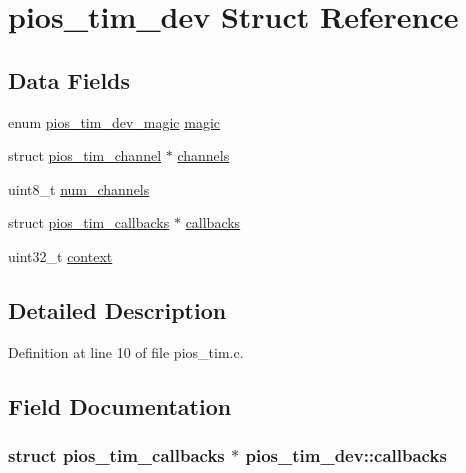 \hypertarget{structpios__tim__dev}{\section{pios\-\_\-tim\-\_\-dev \-Struct \-Reference}
\label{structpios__tim__dev}
}
\subsection*{\-Data \-Fields}
\begin{DoxyCompactItemize}
\item 
enum \hyperlink{_s_t_m32_f10x_2pios__tim_8c_a7d425167804fd43bc76fe29c11386a6c}{pios\-\_\-tim\-\_\-dev\-\_\-magic} \hyperlink{structpios__tim__dev_a3656bfa8d4df8ae08ce3c330edc916f9}{magic}
\item 
struct \hyperlink{structpios__tim__channel}{pios\-\_\-tim\-\_\-channel} $\ast$ \hyperlink{structpios__tim__dev_aa8efb40f5c838a19554da434d2eddf40}{channels}
\item 
uint8\-\_\-t \hyperlink{structpios__tim__dev_a2b129aa6d78b9ba69ff095d8a9c53356}{num\-\_\-channels}
\item 
struct \hyperlink{structpios__tim__callbacks}{pios\-\_\-tim\-\_\-callbacks} $\ast$ \hyperlink{structpios__tim__dev_a1c0871bbdb99b41f2cf6bfa91c375d92}{callbacks}
\item 
uint32\-\_\-t \hyperlink{structpios__tim__dev_aa2ce9a6edd8c06b75330b994f67c95b8}{context}
\end{DoxyCompactItemize}


\subsection{\-Detailed \-Description}


\-Definition at line 10 of file pios\-\_\-tim.\-c.



\subsection{\-Field \-Documentation}
\hypertarget{structpios__tim__dev_a1c0871bbdb99b41f2cf6bfa91c375d92}{
\subsubsection[{callbacks}]{\setlength{\rightskip}{0pt plus 5cm}struct {\bf pios\-\_\-tim\-\_\-callbacks} $\ast$ {\bf pios\-\_\-tim\-\_\-dev\-::callbacks}}}\label{structpios__tim__dev_a1c0871bbdb99b41f2cf6bfa91c375d92}


